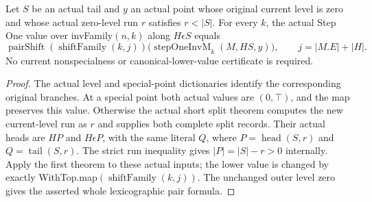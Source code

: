 \begin{theorem}
\label{hir:original-interior-full-family-short-zero-step-one-value}
\leanok
{}
Let $S$ be an actual tail and $y$ an actual point whose original current
level is zero and whose actual zero-level run $r$ satisfies $r<|S|$.
For every $k$, the actual Step One value over invFamily$(n,k)$ along
$H\epsilon S$ equals
\[
 \operatorname{pairShift}(\operatorname{shiftFamily}(k,j))
    \bigl(\operatorname{stepOneInvM}_k(M,HS,y)\bigr),
 \qquad j=|M.E|+|H|.
\]
No current nonspecialness or canonical-lower-value certificate is required.
\end{theorem}
\begin{proof}
The actual level and special-point dictionaries identify the corresponding
original branches.  At a special point both actual values are $(0,\top)$,
and the map preserves this value.  Otherwise the actual short split theorem
computes the new current-level run as $r$ and supplies both complete split
records.  Their actual heads are $HP$ and $H\epsilon P$, with the same
literal $Q$, where $P=\operatorname{head}(S,r)$ and $Q=\operatorname{tail}(S,r)$.
The strict run inequality gives $|P|=|S|-r>0$ internally.  Apply the first
theorem to these actual inputs; the lower value is changed by exactly
WithTop.map$(\operatorname{shiftFamily}(k,j))$.  The unchanged outer level
zero gives the asserted whole lexicographic pair formula.
\end{proof}

